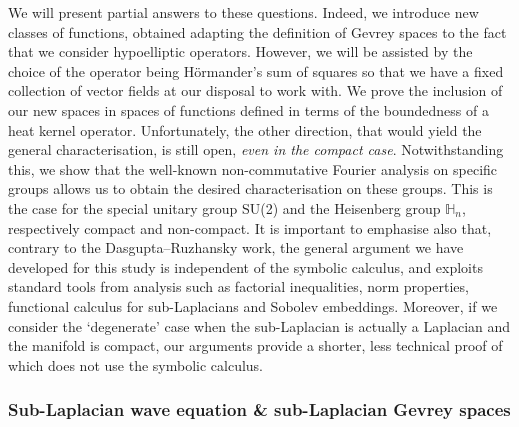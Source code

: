 \documentclass[12pt,oneside,a4paper]{book}
\numberwithin{equation}{section}     %
\theoremstyle{plain}
\theoremstyle{definition}
\newcommand{\h}{{\mathbb H}}
\begin{document}
We will present partial answers to these questions. Indeed, we introduce new classes of functions, obtained adapting the definition of Gevrey spaces to the fact that we consider hypoelliptic operators. However, we will be assisted by the choice of the operator being H\"ormander's sum of squares so that we have a fixed collection of vector fields at our disposal to work with. We prove the inclusion of our new spaces in spaces of functions defined in terms of the boundedness of a heat kernel operator. Unfortunately, the other direction, that would yield the general characterisation, is still open, \textit{even in the compact case}. Notwithstanding this, we show that the well-known non-commutative Fourier analysis on specific groups allows us to obtain the desired characterisation on these groups. This is the case for the special unitary group SU(2) and the Heisenberg group $\h_n$, respectively compact and non-compact. It is important to emphasise also that, contrary to the Dasgupta--Ruzhansky work, the general argument we have developed for this study is independent of the symbolic calculus, and exploits standard tools from analysis such as factorial inequalities, norm properties, functional calculus for sub-Laplacians and Sobolev embeddings. Moreover, if we consider the `degenerate' case when the sub-Laplacian is actually a Laplacian and the manifold is compact, our arguments provide a shorter, less technical proof of \cite[Theorem 2.6]{DR2014} which does not use the symbolic calculus.

\subsubsection{Sub-Laplacian wave equation \& sub-Laplacian Gevrey spaces}
\end{document}
